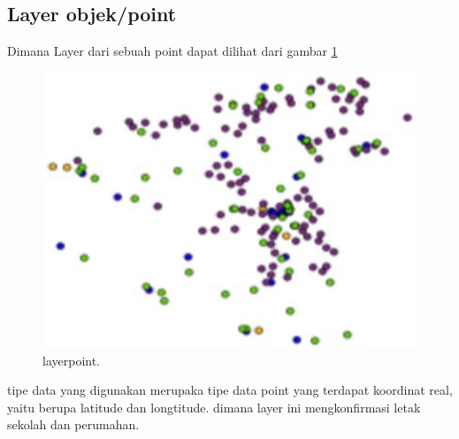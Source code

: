 \begin{enumerate}
\subsection{Layer objek/point}
Dimana Layer dari sebuah point dapat dilihat dari gambar \ref{layerpoint}
 \begin{figure}[ht]
	\centerline{\includegraphics[width=1\textwidth]{figures/layerpoint.JPG}}
	\caption{layerpoint.}
	\label{layerpoint}
	\end{figure}
tipe data yang digunakan merupaka tipe data point yang terdapat koordinat real, yaitu berupa latitude dan longtitude. dimana layer ini mengkonfirmasi letak sekolah dan perumahan.


\end{enumerate}
